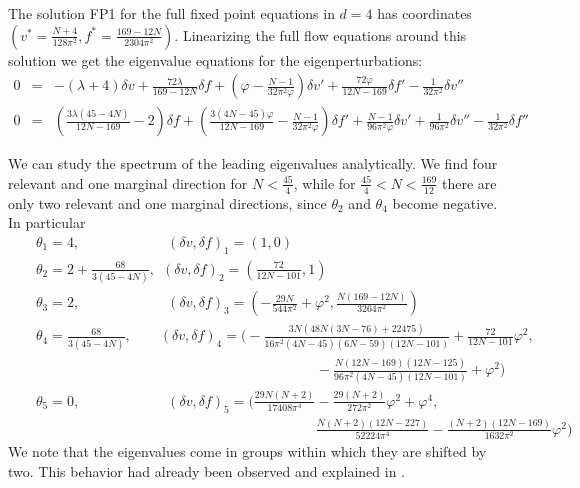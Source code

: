 \documentclass[11pt]{book} %
\newcommand{\bea}{\begin{eqnarray}}
\newcommand{\eea}{\end{eqnarray}}
\newcommand{\nn}{\nonumber}
\begin{document}
The solution FP1 for the full fixed point equations in $d=4$
has coordinates
$\left(v^*=\frac{N+4}{128 \pi ^2},
f^*=\frac{169-12 N}{2304 \pi ^2}\right)$.
Linearizing the full flow equations around this solution
we get the eigenvalue equations for the eigenperturbations:
\bea
0&=&
-(\lambda +4)\delta v
+\frac{72\lambda}{169\!-\!12 N}\delta \!f
+ \left(\varphi-\frac{N-1}{32\pi^2\varphi}\right)\delta v'
+\frac{72\varphi}{12N\!-\!169}\delta\!f'-\frac{1}{32\pi^2}\delta v''  \\
0&=& \left(\frac{3\lambda(45-4N)}{12N\!-\!169}-2\right)\delta\!f
+\left(\frac{3(4N\!-\!45)\varphi}{12N-169}
-\frac{N-1}{32\pi^2\varphi}\right)\delta\!f'
+\frac{N-1}{96\pi^2\varphi}\delta v'
+\frac{1}{96\pi^2}\delta v''
-\frac{1}{32\pi^2}\delta\!f''
\nonumber
\eea


We can study the spectrum of the leading eigenvalues analytically. We find four relevant and one marginal direction for $N<\frac{45}{4}$, while for $\frac{45}{4}<N<\frac{169}{12}$ there are only two relevant and one marginal directions,
since $\theta_2$ and $\theta_4$ become negative. In particular
\bea
&{}&\theta_1=4 , \qquad \qquad  \qquad \ (\delta v,\delta\! f)_1 = (1,0) \\
&{}&\theta_2=2\!+\!\frac{68}{3 (45\!-\!4N)} , \ \
(\delta v,\delta\! f)_2 = \left(\frac{72}{12 N\!-\!101}, 1\right) \nonumber\\
&{}&\theta_3=2 , \qquad\qquad\qquad\
(\delta v,\delta\! f)_3 =
\left(-\frac{29 N}{544\pi^2}+\varphi^2,
\frac{N(169\!-\!12 N)}{3264\pi^2}\right)
\nonumber\\
&{}&\theta_4=\frac{68}{3 (45\!-\!4N)} ,\quad\quad
(\delta v,\delta\! f)_4
=\bigg(-\frac{3N(48N(3 N\!-\!76)+22475)}{16\pi^2(4N\!-\!45)(6N\!-\!59) (12N\!-\!101)}+\frac{72}{12N\!-\! 101}\varphi^2,
\nn
\\
&&
\qquad\qquad\qquad\qquad\qquad\qquad\qquad
\qquad\qquad\qquad
-\frac{N(12N\!-\!169)(12N-125)}
{96\pi^2(4N\!-\!45)(12 N\!-\!101)}+\varphi^2\bigg)
\nonumber\\
&{}&\theta_5=0 , \qquad  \qquad \qquad \ (\delta v,\delta\! f)_5
=\bigg(\frac{29 N (N+2)}{17408\pi^4}-\frac{29(N+2)}{272\pi ^2}\varphi^2+\varphi^4,
\nn\\
&&
\qquad\qquad\qquad\qquad\qquad\qquad\qquad
\qquad\qquad\qquad
\frac{N (N+2) (12 N\!-\!227)}{52224\pi ^4}-\frac{(N+2) (12 N\!-\!169) }{1632\pi^2}\varphi^2\bigg)
\nonumber
\eea
We note that the eigenvalues come in groups
within which they are shifted by two.
This behavior had already been observed and
explained in \cite{narain1}.
%
%
%
%
\end{document}
